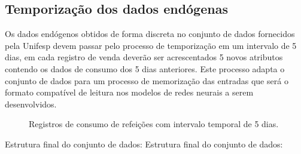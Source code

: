 \documentclass[	12pt, Times, openright, twoside, a4paper, english, brazil]{abntex2}
\begin{document}
	\subsection{Temporização dos dados endógenas}
        Os dados endógenos obtidos de forma discreta no conjunto de dados fornecidos pela Unifesp devem passar pelo processo de temporização em um intervalo de 5 dias, em cada registro de venda deverão ser acrescentados 5 novos atributos contendo os dados de consumo dos 5 dias anteriores. Este processo adapta o conjunto de dados para um processo de memorização das entradas que será o formato compatível de leitura nos modelos de redes neurais a serem desenvolvidos.
        \begin{figure}[!ht]
    		\caption{Registros de consumo de refeições com intervalo temporal de 5 dias.\label{fig:entr_almoco_offset}}
	    \end{figure}
        Estrutura final do conjunto de dados:
	    Estrutura final do conjunto de dados:
	
\end{document}
